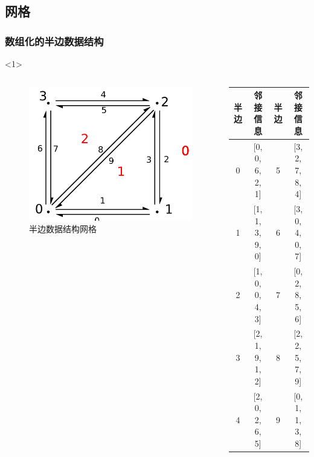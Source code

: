 \documentclass[notheorems,serif]{beamer}
\begin{document}
\subsection{网格}
\begin{frame}
    \frametitle{数组化的半边数据结构}
    \begin{onlyenv}<1>

    \begin{columns}
       \centering
       \begin{figure}[htb]
           \includegraphics[scale=0.3]{../figures/cell.png}
         \caption{半边数据结构网格}
       \end{figure}
       \vspace{1pt}
       {\scriptsize
       \begin{tabular}{cccc}
           \hline
           半边 & 邻接信息 & 半边 & 邻接信息\\
           \hline
           \hline
           0 & [0, 0, 6, 2, 1] & 5 & [3, 2, 7, 8, 4]\\
           1 & [1, 1, 3, 9, 0] & 6 & [3, 0, 4, 0, 7]\\
           2 & [1, 0, 0, 4, 3] & 7 & [0, 2, 8, 5, 6]\\
           3 & [2, 1, 9, 1, 2] & 8 & [2, 2, 5, 7, 9]\\
           4 & [2, 0, 2, 6, 5] & 9 & [0, 1, 1, 3, 8]\\
           \hline
       \end{tabular}}

\end{columns}
\end{onlyenv}
\end{frame}
\end{document}
